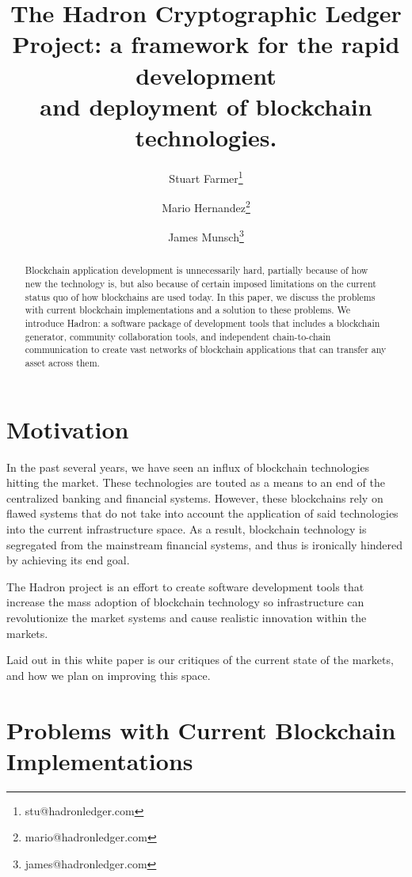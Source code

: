 \documentclass{%
	article}
\title{The Hadron Cryptographic Ledger Project: a framework for the rapid development\\and deployment of blockchain technologies.}
\author{Stuart Farmer\thanks{stu@hadronledger.com}}
\author{Mario Hernandez\thanks{mario@hadronledger.com}}
\author{James Munsch\thanks{james@hadronledger.com}}
\affil{The Hadron Project, White Paper version 0.1}
\begin{document}
\sloppy

\begin{titlingpage}
    \maketitle
    \begin{abstract}
	Blockchain application development is unnecessarily hard, partially because of how new the technology is, but also because of certain imposed limitations on the current status quo of how blockchains are used today. In this paper, we discuss the problems with current blockchain implementations and a solution to these problems. We introduce Hadron: a software package of development tools that includes a blockchain generator, community collaboration tools, and independent chain-to-chain communication to create vast networks of blockchain applications that can transfer any asset across them.
    \end{abstract}
\end{titlingpage}

\section{Motivation}

In the past several years, we have seen an influx of blockchain technologies hitting the market. These technologies are touted as a means to an end of the centralized banking and financial systems. However, these blockchains rely on flawed systems that do not take into account the application of said technologies into the current infrastructure space. As a result, blockchain technology is segregated from the mainstream financial systems, and thus is ironically hindered by achieving its end goal.

The Hadron project is an effort to create software development tools that increase the mass adoption of blockchain technology so infrastructure can revolutionize the market systems and cause realistic innovation within the markets.

Laid out in this white paper is our critiques of the current state of the markets, and how we plan on improving this space.

\section{Problems with Current Blockchain\\ Implementations}
\end{document}
